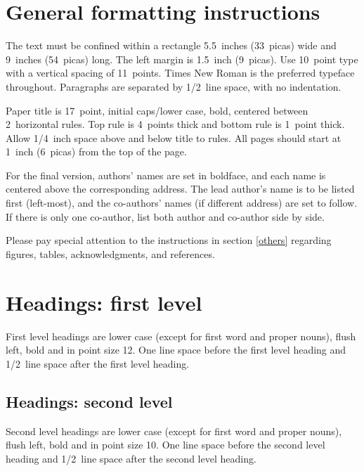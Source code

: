 \documentclass{article} %
\begin{document}

\section{General formatting instructions}
\label{gen_inst}

The text must be confined within a rectangle 5.5~inches (33~picas) wide and
9~inches (54~picas) long. The left margin is 1.5~inch (9~picas).
Use 10~point type with a vertical spacing of 11~points. Times New Roman is the
preferred typeface throughout. Paragraphs are separated by 1/2~line space,
with no indentation.

Paper title is 17~point, initial caps/lower case, bold, centered between
2~horizontal rules. Top rule is 4~points thick and bottom rule is 1~point
thick. Allow 1/4~inch space above and below title to rules. All pages should
start at 1~inch (6~picas) from the top of the page.


For the final version, authors' names are
set in boldface, and each name is centered above the corresponding
address. The lead author's name is to be listed first (left-most), and
the co-authors' names (if different address) are set to follow. If
there is only one co-author, list both author and co-author side by side.

Please pay special attention to the instructions in section \ref{others}
regarding figures, tables, acknowledgments, and references.

\section{Headings: first level}
\label{headings}

First level headings are lower case (except for first word and proper nouns),
flush left, bold and in point size 12. One line space before the first level
heading and 1/2~line space after the first level heading.

\subsection{Headings: second level}

Second level headings are lower case (except for first word and proper nouns),
flush left, bold and in point size 10. One line space before the second level
heading and 1/2~line space after the second level heading.
\end{document}
